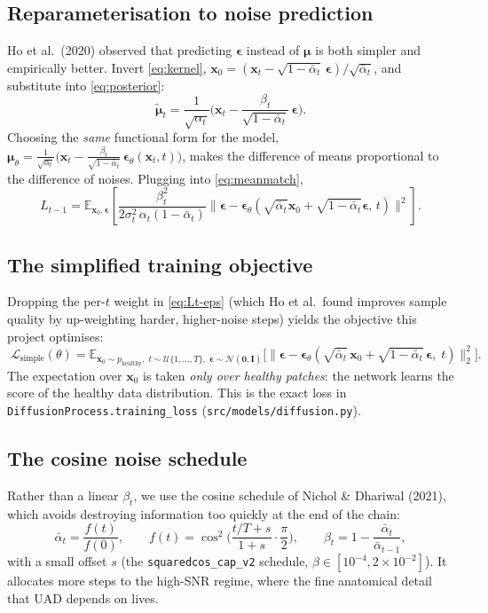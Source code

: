 \documentclass[12pt,a4paper]{article}
\newcommand{\E}{\mathbb{E}}
\newcommand{\N}{\mathcal{N}}
\newcommand{\x}{\bm{x}}
\newcommand{\eps}{\bm{\epsilon}}
\newcommand{\II}{\mathbf{I}}
\newcommand{\abar}{\bar{\alpha}}
\begin{document}
\subsection{Reparameterisation to noise prediction}
Ho et al.\ (2020) observed that predicting $\eps$ instead of $\bm\mu$ is both
simpler and empirically better. Invert \eqref{eq:kernel},
$\x_0=(\x_t-\sqrt{1-\abar_t}\,\eps)/\sqrt{\abar_t}$, and substitute into
\eqref{eq:posterior}:
\begin{equation}
\tilde{\bm\mu}_t=\frac{1}{\sqrt{\alpha_t}}\Big(\x_t-\frac{\beta_t}{\sqrt{1-\abar_t}}\,\eps\Big).
\label{eq:mu-eps}
\end{equation}
Choosing the \emph{same} functional form for the model,
$\bm\mu_\theta=\frac{1}{\sqrt{\alpha_t}}\big(\x_t-\frac{\beta_t}{\sqrt{1-\abar_t}}\,\eps_\theta(\x_t,t)\big)$,
makes the difference of means proportional to the difference of noises. Plugging
into \eqref{eq:meanmatch},
\begin{equation}
L_{t-1}=\E_{\x_0,\eps}\!\left[\frac{\beta_t^2}{2\sigma_t^2\,\alpha_t(1-\abar_t)}
\big\|\eps-\eps_\theta(\sqrt{\abar_t}\x_0+\sqrt{1-\abar_t}\eps,\,t)\big\|^2\right].
\label{eq:Lt-eps}
\end{equation}

\subsection{The simplified training objective}
Dropping the per-$t$ weight in \eqref{eq:Lt-eps} (which Ho et al.\ found improves
sample quality by up-weighting harder, higher-noise steps) yields the objective
this project optimises:
\begin{equation}
\boxed{\;
\mathcal{L}_{\text{simple}}(\theta)=
\E_{\x_0\sim p_{\text{healthy}},\;t\sim\mathcal U\{1,\dots,T\},\;\eps\sim\N(\bm0,\II)}
\Big[\big\|\eps-\eps_\theta(\sqrt{\abar_t}\,\x_0+\sqrt{1-\abar_t}\,\eps,\;t)\big\|_2^2\Big].
\;}
\label{eq:simple}
\end{equation}
The expectation over $\x_0$ is taken \emph{only over healthy patches}: the network
learns the score of the healthy data distribution. This is the exact loss in
\texttt{DiffusionProcess.training\_loss} (\texttt{src/models/diffusion.py}).

\subsection{The cosine noise schedule}
Rather than a linear $\beta_t$, we use the cosine schedule of Nichol \& Dhariwal
(2021), which avoids destroying information too quickly at the end of the chain:
\begin{equation}
\abar_t=\frac{f(t)}{f(0)},\qquad f(t)=\cos^2\!\Big(\frac{t/T+s}{1+s}\cdot\frac{\pi}{2}\Big),
\qquad \beta_t=1-\frac{\abar_t}{\abar_{t-1}},
\label{eq:cosine}
\end{equation}
with a small offset $s$ (the \texttt{squaredcos\_cap\_v2} schedule,
$\beta\in[10^{-4},2\!\times\!10^{-2}]$). It allocates more steps to the
high-SNR regime, where the fine anatomical detail that UAD depends on lives.
\end{document}
